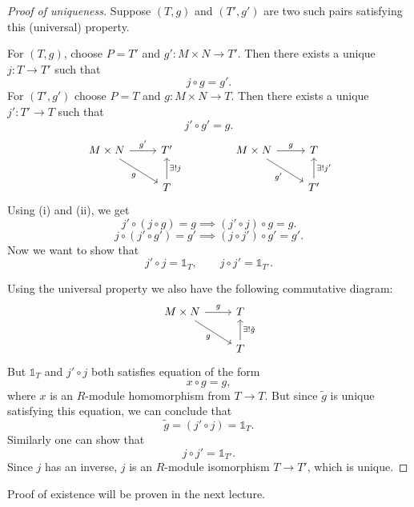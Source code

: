 \begin{proof}[Proof of uniqueness]
    Suppose \( (T, g) \) and  \( (T', g') \) are two such pairs satisfying this (universal) property.

    For \( (T, g) \), choose  \( P = T' \) and  \( g': M \times N \to T' \). Then there exists a unique \( j: T \to T' \) such that
    \[
        j \circ g = g'.\tag{i}
    \] 
For  \( (T', g') \) choose  \( P = T \) and \( g: M \times N \to T \). Then there exists a unique \( j': T' \to T \) such that
   \[
       j' \circ g' = g.\tag{ii}
   \]
\[\begin{tikzcd}
	{M \times N} & {T'} && {M \times N} & T \\
	& T &&& {T'}
	\arrow["{g'}", from=1-1, to=1-2]
	\arrow["g"', from=1-1, to=2-2]
	\arrow["g", from=1-4, to=1-5]
	\arrow["{g'}"', from=1-4, to=2-5]
	\arrow["{\exists!j}"', from=2-2, to=1-2]
	\arrow["{\exists!j'}"', from=2-5, to=1-5]
\end{tikzcd}\]
Using (i) and (ii), we get 
\[
    j' \circ (j \circ g) = g \implies (j' \circ j) \circ g = g.\tag{iii}
\]
\[
    j \circ (j' \circ g') = g' \implies (j \circ j') \circ g' = g'.\tag{iv}
\] 
Now we want to show that 
\[
    j' \circ j = \mathds{1}_T, \qquad j \circ j' = \mathds{1}_{T'}.
\] 


Using the universal property we also have the following commutative diagram:
\[\begin{tikzcd}
	{M \times N} & T \\
	& T
    \arrow["{g}", from=1-1, to=1-2]
	\arrow["g"', from=1-1, to=2-2]
	\arrow["{\exists!\tilde{g}}"', from=2-2, to=1-2]
\end{tikzcd}\]
But \( \mathds{1}_T \) and \( j' \circ j \) both satisfies equation of the form \[
x \circ g = g,
\] 
where \( x \) is an  \( R \)-module homomorphism from  \( T \to T \). But since \( \widetilde{g} \) is unique satisfying this equation, we can conclude that
\[
\widetilde{g} = (j' \circ j) = \mathds{1}_T.
\]
Similarly one can show that 
\[
    j \circ j' = \mathds{1}_{T'}.
\] 
Since \( j \) has an inverse,  \( j \) is an  \( R \)-module isomorphism \( T \to T' \), which is unique. 
\end{proof}
Proof of existence will be proven in the next lecture.

